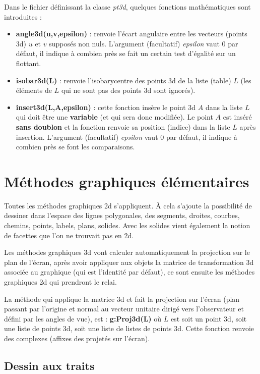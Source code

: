Dans le fichier définissant la classe \emph{pt3d}, quelques fonctions mathématiques sont introduites :
\begin{itemize}
    \item \textbf{angle3d(u,v,epsilon)} : renvoie l'écart angulaire entre les vecteurs (points 3d) $u$ et $v$ supposés non nuls. L'argument (facultatif) \emph{epsilon} vaut $0$ par défaut, il indique à combien près se fait un certain test d'égalité sur un flottant.
    \item \textbf{isobar3d(L)} : renvoie l'isobarycentre des points 3d de la liste (table) $L$ (les éléments de $L$ qui ne sont pas des points 3d sont ignorés).
    \item \textbf{insert3d(L,A,epsilon)} : cette fonction insère le point 3d $A$ dans la liste $L$ qui doit être une \textbf{variable} (et qui sera donc modifiée). Le point $A$ est inséré \textbf{sans doublon} et la fonction renvoie sa position (indice) dans la liste $L$ après insertion. L'argument (facultatif) \emph{epsilon} vaut $0$ par défaut, il indique à combien près se font les comparaisons.
\end{itemize}

\section{Méthodes graphiques élémentaires}

Toutes les méthodes graphiques 2d s'appliquent. À cela s'ajoute la possibilité de dessiner dans l'espace des lignes polygonales, des segments, droites, courbes, chemins, points, labels, plans, solides. Avec les solides vient également la notion de facettes que l'on ne trouvait pas en 2d.

Les méthodes graphiques 3d vont calculer automatiquement la projection sur le plan de l'écran, après avoir appliquer aux objets la matrice de transformation 3d associée au graphique (qui est l'identité par défaut), ce sont ensuite les méthodes graphiques 2d qui prendront le relai.

La méthode qui applique la matrice 3d et fait la projection sur l'écran (plan passant par l'origine et normal au vecteur unitaire dirigé vers l'observateur et défini par les angles de vue), est : \textbf{g:Proj3d(L)} où $L$ est soit un point 3d, soit une liste de points 3d, soit une liste de listes de points 3d. Cette fonction renvoie des complexes (affixes des projetés sur l'écran).

\subsection{Dessin aux traits}

